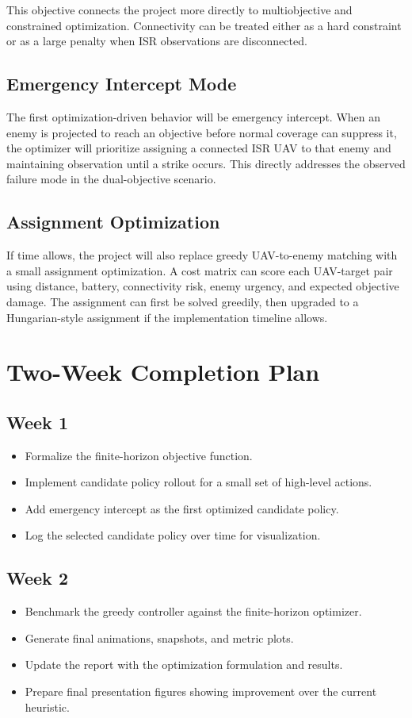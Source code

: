 \documentclass[conference]{IEEEtran}
\begin{document}
This objective connects the project more directly to multiobjective and
constrained optimization. Connectivity can be treated either as a hard
constraint or as a large penalty when ISR observations are disconnected.

\subsection{Emergency Intercept Mode}
The first optimization-driven behavior will be emergency intercept. When an
enemy is projected to reach an objective before normal coverage can suppress it,
the optimizer will prioritize assigning a connected ISR UAV to that enemy and
maintaining observation until a strike occurs. This directly addresses the
observed failure mode in the dual-objective scenario.

\subsection{Assignment Optimization}
If time allows, the project will also replace greedy UAV-to-enemy matching with
a small assignment optimization. A cost matrix can score each UAV-target pair
using distance, battery, connectivity risk, enemy urgency, and expected
objective damage. The assignment can first be solved greedily, then upgraded to
a Hungarian-style assignment if the implementation timeline allows.

\section{Two-Week Completion Plan}

\subsection{Week 1}
\begin{itemize}
    \item Formalize the finite-horizon objective function.
    \item Implement candidate policy rollout for a small set of high-level actions.
    \item Add emergency intercept as the first optimized candidate policy.
    \item Log the selected candidate policy over time for visualization.
\end{itemize}

\subsection{Week 2}
\begin{itemize}
    \item Benchmark the greedy controller against the finite-horizon optimizer.
    \item Generate final animations, snapshots, and metric plots.
    \item Update the report with the optimization formulation and results.
    \item Prepare final presentation figures showing improvement over the current heuristic.
\end{itemize}
\end{document}
